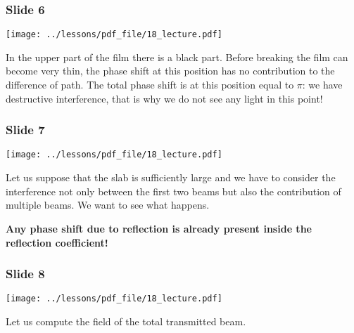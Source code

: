 \documentclass[../main/main.tex]{subfiles}
\begin{document}
\subsubsection*{Slide 6}

\begin{minipage}[]{0.5\linewidth}
\centering
\texttt{[image: ../lessons/pdf\_file/18\_lecture.pdf]}
\end{minipage}
\hspace{0.3cm}\vspace{0.3cm}
\begin{minipage}[c]{0.47\linewidth}

In the upper part of the film there is a black part. Before breaking the film can become very thin, the phase shift at this position has no contribution to the difference of path. The total phase shift is at this position equal to \( \pi  \): we have destructive interference, that is why we do not see any light in this point!

\end{minipage}

\newpage

\subsubsection*{Slide 7}

\begin{minipage}[]{0.5\linewidth}
\centering
\texttt{[image: ../lessons/pdf\_file/18\_lecture.pdf]}
\end{minipage}
\hspace{0.3cm}\vspace{0.3cm}
\begin{minipage}[c]{0.47\linewidth}

Let us suppose that the slab is sufficiently large and we have to consider the interference not only between the first two beams but also the contribution of multiple beams. We want to see what happens.

\textbf{Any phase shift due to reflection is already present inside the reflection coefficient!}

\end{minipage}

\subsubsection*{Slide 8}

\begin{minipage}[]{0.5\linewidth}
\centering
\texttt{[image: ../lessons/pdf\_file/18\_lecture.pdf]}
\end{minipage}
\hspace{0.3cm}\vspace{0.3cm}
\begin{minipage}[c]{0.47\linewidth}

Let us compute the field of the total transmitted beam.

\end{minipage}
\end{document}
